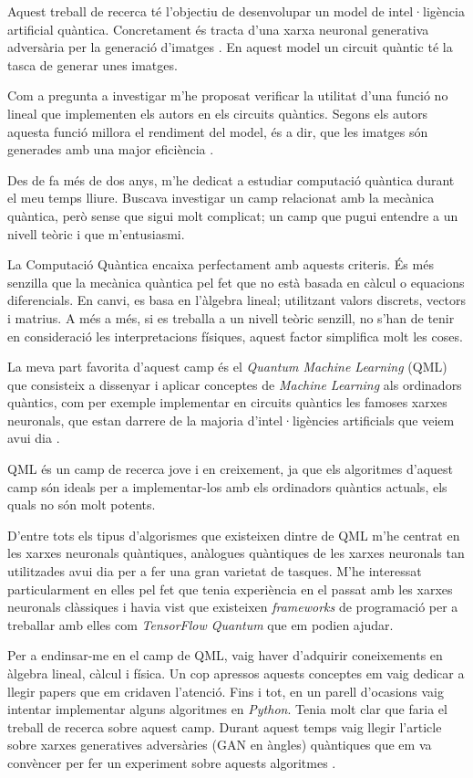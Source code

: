 Aquest treball de recerca té l'objectiu de desenvolupar un model de intel·ligència artificial quàntica. Concretament és tracta d'una xarxa neuronal generativa adversària per la generació d'imatges \cite{QGAN_exp, GAN2014}. En aquest model un circuit quàntic té la tasca de generar unes imatges. 

Com a pregunta a investigar m'he proposat verificar la utilitat d'una funció no lineal que implementen els autors en els circuits quàntics. Segons els autors aquesta funció millora el rendiment del model, és a dir, que les imatges són generades amb una major eficiència \cite{QGAN_exp}.

Des de fa més de dos anys, m'he dedicat a estudiar computació quàntica durant el meu temps lliure. Buscava investigar un camp relacionat amb la mecànica quàntica, però sense que sigui molt complicat; un camp que pugui entendre a un nivell teòric i que m'entusiasmi.

La Computació Quàntica encaixa perfectament amb aquests criteris. És més senzilla que la mecànica quàntica pel fet que no està basada en càlcul o equacions diferencials. En canvi, es basa en l'àlgebra lineal; utilitzant valors discrets, vectors i matrius. A més a més, si es treballa a un nivell teòric senzill, no s'han de tenir en consideració les interpretacions físiques, aquest factor simplifica molt les coses.

La meva part favorita d'aquest camp és el \textit{Quantum Machine Learning} (QML) que consisteix a dissenyar i aplicar conceptes de \textit{Machine Learning} als ordinadors quàntics, com per exemple implementar en circuits quàntics les famoses xarxes neuronals, que estan darrere de la majoria d'intel·ligències artificials que veiem avui dia \cite{schuld:2014}.

QML és un camp de recerca jove i en creixement, ja que els algoritmes d'aquest camp són ideals per a implementar-los amb els ordinadors quàntics actuals, els quals no són molt potents.

D'entre tots els tipus d'algorismes que existeixen dintre de QML m'he centrat en les xarxes neuronals quàntiques, anàlogues quàntiques de les xarxes neuronals tan utilitzades avui dia per a fer una gran varietat de tasques. M'he interessat particularment en elles pel fet que tenia experiència en el passat amb les xarxes neuronals clàssiques i havia vist que existeixen \textit{frameworks} de programació per a treballar amb elles com \textit{TensorFlow Quantum} \cite{tfq} que em podien ajudar.

Per a endinsar-me en el camp de QML, vaig haver d'adquirir coneixements en àlgebra lineal, càlcul i física. Un cop apressos aquests conceptes em vaig dedicar a llegir papers que em cridaven l'atenció. Fins i tot, en un parell d'ocasions vaig intentar implementar alguns algoritmes en \textit{Python}. Tenia molt clar que faria el treball de recerca sobre aquest camp. Durant aquest temps vaig llegir l'article sobre xarxes generatives adversàries (GAN en àngles) quàntiques que em va convèncer per fer un experiment sobre aquests algoritmes \cite{QGAN_exp}.




